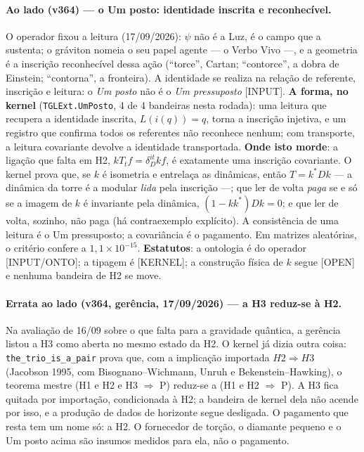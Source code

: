 \documentclass[11pt]{article}
\theoremstyle{definition}\newtheorem{deriv}{Derivação}
\begin{document}
\paragraph*{Ao lado (v364) --- o Um posto: identidade inscrita e reconhecível.} O operador fixou a leitura (17/09/2026): $\psi$ não é a Luz, é o campo que a sustenta; o gráviton nomeia o seu papel agente --- o Verbo Vivo ---, e a geometria é a inscrição reconhecível dessa ação (``torce'', Cartan; ``contorce'', a dobra de Einstein; ``contorna'', a fronteira). A identidade se realiza na relação de referente, inscrição e leitura: o \emph{Um posto} não é o \emph{Um pressuposto} [INPUT]. \textbf{A forma, no kernel} (\texttt{TGLExt.UmPosto}, 4 de 4 bandeiras nesta rodada): uma leitura que recupera a identidade inscrita, $L(i(q))=q$, torna a inscrição injetiva, e um registro que confirma todos os referentes não reconhece nenhum; com transporte, a leitura covariante devolve a identidade transportada. \textbf{Onde isto morde}: a ligação que falta em H2, $kT_tf=\delta_D^{it}kf$, é exatamente uma inscrição covariante. O kernel prova que, se $k$ é isometria e entrelaça as dinâmicas, então $T=k^*Dk$ --- a dinâmica da torre é a modular \emph{lida} pela inscrição ---; que ler de volta \emph{paga} se e só se a imagem de $k$ é invariante pela dinâmica, $(1-kk^*)Dk=0$; e que ler de volta, sozinho, não paga (há contraexemplo explícito). A consistência de uma leitura é o Um pressuposto; a covariância é o pagamento. Em matrizes aleatórias, o critério confere a $1,1\times10^{-15}$. \textbf{Estatutos}: a ontologia é do operador [INPUT/ONTO]; a tipagem é [KERNEL]; a construção física de $k$ segue [OPEN] e nenhuma bandeira de H2 se move.

\paragraph*{Errata ao lado (v364, gerência, 17/09/2026) --- a H3 reduz-se à H2.} Na avaliação de 16/09 sobre o que falta para a gravidade quântica, a gerência listou a H3 como aberta no mesmo estado da H2. O kernel já dizia outra coisa: \texttt{the\_trio\_is\_a\_pair} prova que, com a implicação importada $H2\Rightarrow H3$ (Jacobson 1995, com Bisognano--Wichmann, Unruh e Bekenstein--Hawking), o teorema mestre (H1 e H2 e H3 $\Rightarrow$ P) reduz-se a (H1 e H2 $\Rightarrow$ P). A H3 fica quitada por importação, condicionada à H2; a bandeira de kernel dela não acende por isso, e a produção de dados de horizonte segue desligada. O pagamento que resta tem um nome só: a H2. O fornecedor de torção, o diamante pequeno e o Um posto acima são insumos medidos para ela, não o pagamento.
\end{document}
